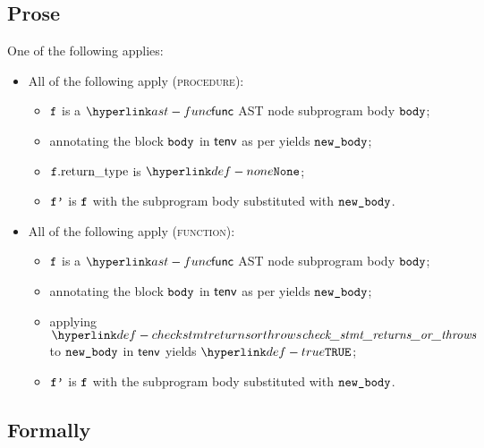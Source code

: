 \subsection{Prose}
One of the following applies:
\begin{itemize}
  \item All of the following apply (\textsc{procedure}):
  \begin{itemize}
    \item $\vf$ is a $\func$ AST node subprogram body $\body$;
    \item annotating the block $\body$ in $\tenv$ as per  yields $\newbody$\ProseOrTypeError;
    \item $\vf.\funcreturntype$ is $\None$;
    \item $\vfp$ is $\vf$ with the subprogram body substituted with $\newbody$.
  \end{itemize}

  \item All of the following apply (\textsc{function}):
  \begin{itemize}
    \item $\vf$ is a $\func$ AST node subprogram body $\body$;
    \item annotating the block $\body$ in $\tenv$ as per  yields $\newbody$\ProseOrTypeError;
    \item applying $\checkstmtreturnsorthrows$ to $\newbody$ in $\tenv$ yields $\True$\ProseOrTypeError;
    \item $\vfp$ is $\vf$ with the subprogram body substituted with $\newbody$.
  \end{itemize}
\end{itemize}

\subsection{Formally}
\begin{mathpar}
\end{mathpar}

\begin{mathpar}
\end{mathpar}

